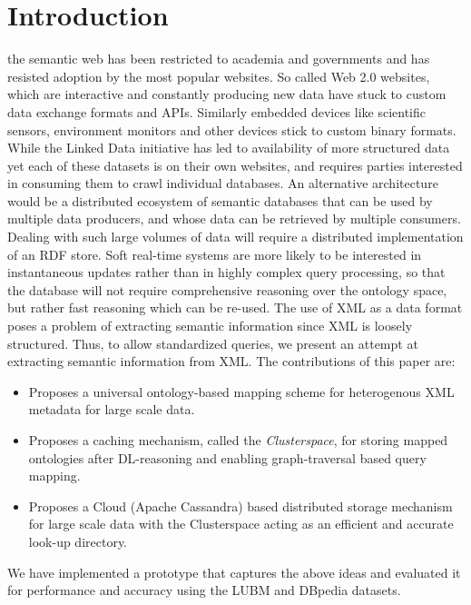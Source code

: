 \documentclass[journal]{IEEEtran}
\begin{document}
\section{Introduction}  the semantic web has been
restricted to academia and governments and has resisted adoption by the most
popular websites. So called Web 2.0 websites, which are interactive and
constantly producing new data have stuck to custom data exchange formats and
APIs. Similarly embedded devices like scientific sensors, environment monitors
and other devices stick to custom binary formats.  While the Linked Data
initiative has led to availability of more structured data yet each of these
datasets is on their own websites, and requires parties interested in consuming
them to crawl individual databases. An alternative architecture would be
a distributed ecosystem of semantic databases that can be used by multiple data
producers, and whose data can be retrieved by multiple consumers. Dealing with
such large volumes of data will require a distributed implementation of an RDF
store. Soft real-time systems are more likely to be interested in instantaneous
updates rather than in highly complex query processing, so that the database
will not require comprehensive reasoning over the ontology space, but rather
fast reasoning which can be re-used. The use of XML as a data format poses
a problem of extracting semantic information since XML is loosely structured.
Thus, to allow standardized queries, we present an attempt at extracting
semantic information from XML. The contributions of this paper are:

\begin{itemize}
    \item Proposes a universal ontology-based mapping scheme for heterogenous
        XML metadata for large scale data.

    \item Proposes a caching mechanism, called the \emph{Clusterspace}, for
        storing mapped ontologies after DL-reasoning and enabling
        graph-traversal based query mapping.

    \item Proposes a Cloud (Apache Cassandra) based distributed storage
        mechanism for large scale data with the Clusterspace acting as an
        efficient and accurate look-up directory.

\end{itemize}

We have implemented a prototype that captures the above ideas and evaluated it
for performance and accuracy using the LUBM\cite{Guo05lubm} and
DBpedia\cite{Auer07dbpedia} datasets.
\end{document}
